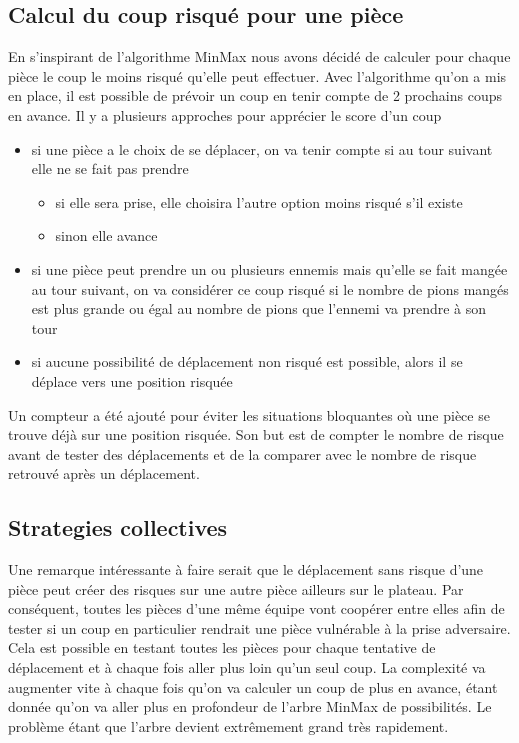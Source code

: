 \documentclass[11pt]{article} %
\begin{document}
\subsection{Calcul du coup risqué pour une pièce}

En s’inspirant de l’algorithme MinMax nous avons décidé de calculer pour chaque pièce le coup le moins risqué qu’elle peut effectuer. Avec l’algorithme qu’on a mis en place, il est possible de prévoir un coup en tenir compte de 2 prochains coups en avance. 
Il y a plusieurs approches pour apprécier le score d’un coup
\begin{itemize}
\item si une pièce a le choix de se déplacer, on va tenir compte si au tour suivant elle ne se fait pas prendre
\begin{itemize}
\item si elle sera prise, elle choisira l’autre option moins risqué s’il existe
\item sinon elle avance
\end{itemize}
\item si une pièce peut prendre un ou plusieurs ennemis mais qu’elle se fait mangée au tour suivant, on va considérer ce coup risqué si le nombre de pions mangés est plus grande ou égal au nombre de pions que l’ennemi va prendre à son tour
\item si aucune possibilité de déplacement non risqué est possible, alors il se déplace vers une position risquée
\end{itemize}

Un compteur a été ajouté pour éviter les situations bloquantes où une pièce se trouve déjà sur une position risquée. Son but est de compter le nombre de risque avant de tester des déplacements et de la comparer avec le nombre de risque retrouvé après un déplacement. 

\subsection{Strategies collectives}

Une remarque intéressante à faire serait que le déplacement sans risque d’une pièce peut créer des risques sur une autre pièce ailleurs sur le plateau. Par conséquent, toutes les pièces d'une même équipe vont coopérer entre elles afin de tester si un coup en particulier rendrait une pièce vulnérable à la prise adversaire. Cela est possible en testant toutes les pièces pour chaque tentative de déplacement et à chaque fois aller plus loin qu'un seul coup.  
La complexité va augmenter vite à chaque fois qu’on va calculer un coup de plus en avance, étant donnée qu’on va aller plus en profondeur de l’arbre MinMax de possibilités.
Le problème étant que l'arbre devient extrêmement grand très rapidement.
\end{document}
